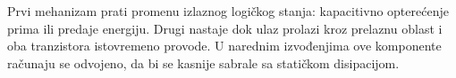 Prvi mehanizam prati promenu izlaznog logičkog stanja: kapacitivno opterećenje prima ili predaje energiju. Drugi nastaje dok ulaz prolazi kroz prelaznu oblast i oba tranzistora istovremeno provode. U narednim izvođenjima ove komponente računaju se odvojeno, da bi se kasnije sabrale sa statičkom disipacijom.
